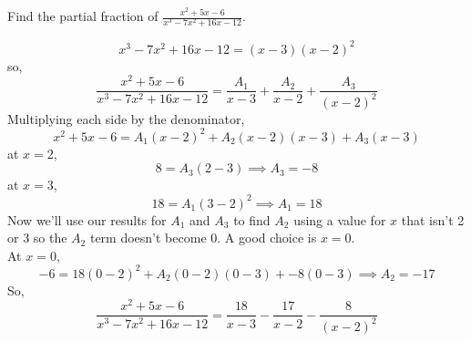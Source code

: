 \begin{example}
	Find the partial fraction of $\frac{x^2+5x-6}{x^3-7x^2+16x-12}$.
\end{example}
\begin{equation*}
	x^3-7x^2+16x-12 = (x-3)(x-2)^2
\end{equation*}
so,
\begin{equation*}
	\frac{x^2+5x-6}{x^3-7x^2+16x-12} =  \frac{A_1}{x-3} + \frac{A_2}{x-2} + \frac{A_3}{(x-2)^2} 
\end{equation*}
Multiplying each side by the denominator,
\begin{equation*}
	x^2+5x-6 = A_1(x-2)^2 + A_2(x-2)(x-3) + A_3(x-3)
\end{equation*}
at $x=2$,
\begin{equation*}
	8 = A_3(2-3) \implies A_3 = -8
\end{equation*}
at $x=3$,
\begin{equation*}
	18 = A_1(3-2)^2 \implies A_1 = 18
\end{equation*}
Now we'll use our results for $A_1$ and $A_3$ to find $A_2$ using a value for $x$ that isn't 2 or 3 so the $A_2$ term doesn't become 0. A good choice is $x=0$.\\
At $x=0$,
\begin{equation*}
	-6 = 18(0-2)^2 + A_2(0-2)(0-3) + -8(0-3) \implies A_2 = -17
\end{equation*}
So,
\begin{equation*}
	\frac{x^2+5x-6}{x^3-7x^2+16x-12} = \frac{18}{x-3} - \frac{17}{x-2} - \frac{8}{(x-2)^2}
\end{equation*}